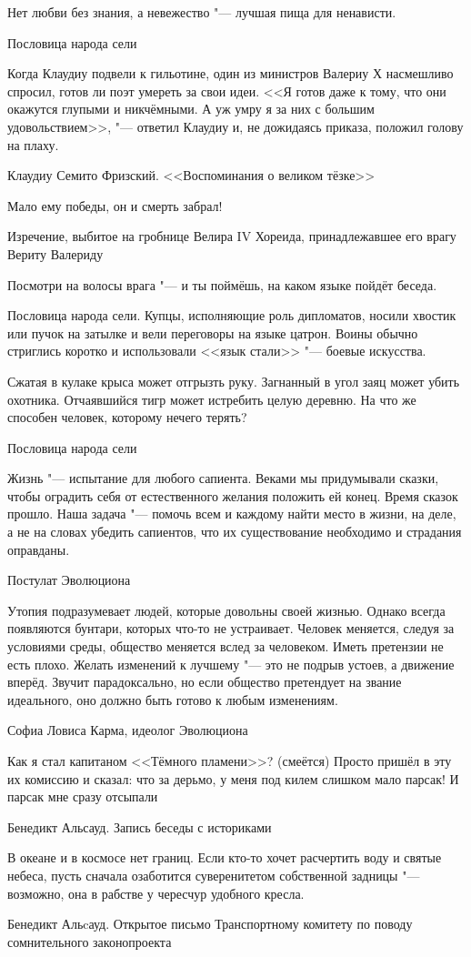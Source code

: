 \epigraph
{Нет любви без знания, а невежество "--- лучшая пища для ненависти.}
{Пословица народа сели}

\epigraph
{Когда Клаудиу подвели к гильотине, один из министров Валериу Х насмешливо спросил, готов ли поэт умереть за свои идеи.
<<Я готов даже к тому, что они окажутся глупыми и никчёмными.
А уж умру я за них с большим удовольствием>>, "--- ответил Клаудиу и, не дожидаясь приказа, положил голову на плаху.}
{Клаудиу Семито Фризский. 
<<Воспоминания о великом тёзке>>}

\epigraph
{Мало ему победы, он и смерть забрал!}
{Изречение, выбитое на гробнице Велира IV Хореида, принадлежавшее его врагу Вериту Валериду}

\epigraph
{Посмотри на волосы врага "--- и ты поймёшь, на каком языке пойдёт беседа.}
{Пословица народа сели.
Купцы, исполняющие роль дипломатов, носили хвостик или пучок на затылке и вели переговоры на языке цатрон.
Воины обычно стриглись коротко и использовали <<язык стали>> "--- боевые искусства.}

\epigraph
{Сжатая в кулаке крыса может отгрызть руку.
Загнанный в угол заяц может убить охотника.
Отчаявшийся тигр может истребить целую деревню.
На что же способен человек, которому нечего терять?}
{Пословица народа сели}

\epigraph
{Жизнь "--- испытание для любого сапиента.
Веками мы придумывали сказки, чтобы оградить себя от естественного желания положить ей конец.
Время сказок прошло.
Наша задача "--- помочь всем и каждому найти место в жизни, на деле, а не на словах убедить сапиентов, что их существование необходимо и страдания оправданы.}
{Постулат Эволюциона}

\epigraph
{Утопия подразумевает людей, которые довольны своей жизнью.
Однако всегда появляются бунтари, которых что-то не устраивает.
Человек меняется, следуя за условиями среды, общество меняется вслед за человеком.
Иметь претензии не есть плохо.
Желать изменений к лучшему "--- это не подрыв устоев, а движение вперёд.
Звучит парадоксально, но если общество претендует на звание идеального, оно должно быть готово к любым изменениям.}
{Софиа Ловиса Карма, идеолог Эволюциона}

\epigraph
{Как я стал капитаном <<Тёмного пламени>>?
(смеётся) Просто пришёл в эту их комиссию и сказал: что за дерьмо, у меня под килем слишком мало парсак!
И парсак мне сразу отсыпали\ldotst}
{Бенедикт Альсауд.
Запись беседы с историками}

\epigraph
{В океане и в космосе нет границ.
Если кто-то хочет расчертить воду и святые небеса, пусть сначала озаботится суверенитетом собственной задницы "--- возможно, она в рабстве у чересчур удобного кресла.}
{Бенедикт Альcауд.
Открытое письмо Транспортному комитету по поводу сомнительного законопроекта}

